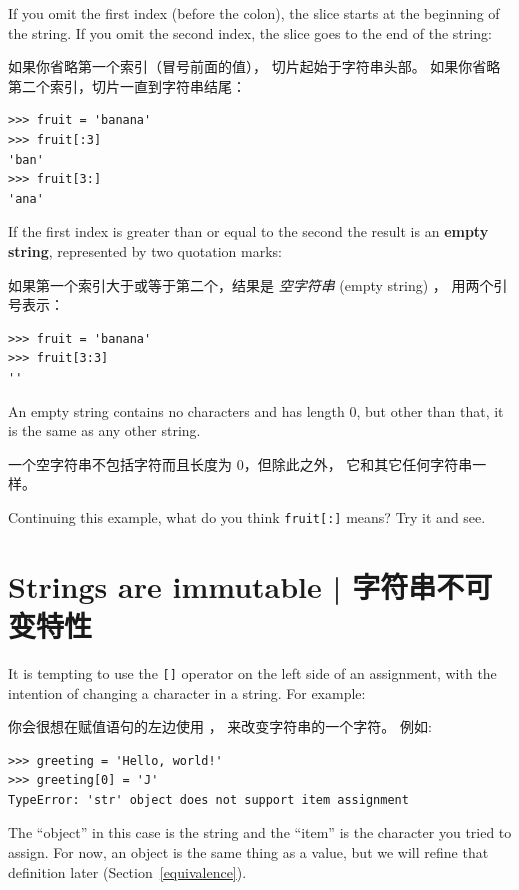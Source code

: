 If you omit the first index (before the colon), the slice starts at
the beginning of the string.  If you omit the second index, the slice
goes to the end of the string:

如果你省略第一个索引（冒号前面的值）， 切片起始于字符串头部。 如果你省略第二个索引，切片一直到字符串结尾：

\begin{lstlisting}
>>> fruit = 'banana'
>>> fruit[:3]
'ban'
>>> fruit[3:]
'ana'
\end{lstlisting}

%
If the first index is greater than or equal to the second the result
is an {\bf empty string}, represented by two quotation marks:

如果第一个索引大于或等于第二个，结果是 {\em 空字符串} (empty string) ， 用两个引号表示：


\begin{lstlisting}
>>> fruit = 'banana'
>>> fruit[3:3]
''
\end{lstlisting}

%
An empty string contains no characters and has length 0, but other
than that, it is the same as any other string.

一个空字符串不包括字符而且长度为 0，但除此之外， 它和其它任何字符串一样。

Continuing this example, what do you think
{\tt fruit[:]} means?  Try it and see.
  


\section{Strings are immutable  |  字符串不可变特性}
    

It is tempting to use the {\tt []} operator on the left side of an
assignment, with the intention of changing a character in a string.
For example:
  

你会很想在赋值语句的左边使用 \li{[]}， 来改变字符串的一个字符。 例如:
  


\begin{lstlisting}
>>> greeting = 'Hello, world!'
>>> greeting[0] = 'J'
TypeError: 'str' object does not support item assignment
\end{lstlisting}

%
The ``object'' in this case is the string and the ``item'' is
the character you tried to assign.  For now, an object is
the same thing as a value, but we will refine that definition
later (Section~\ref{equivalence}).
    
  

